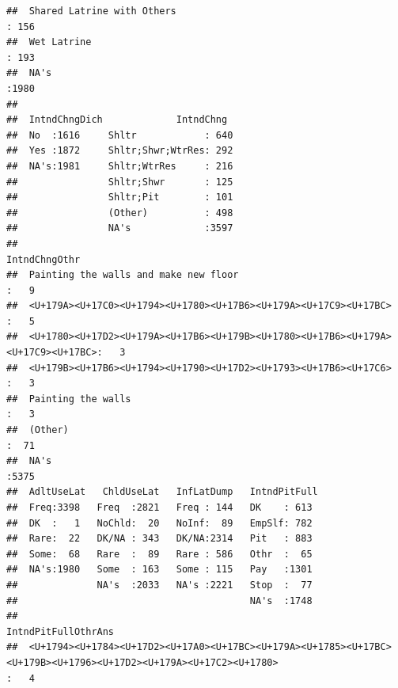 \documentclass[11pt,]{article}
\begin{document}
\begin{verbatim}
##  Shared Latrine with Others                                                                                                                                                                      : 156  
##  Wet Latrine                                                                                                                                                                                     : 193  
##  NA's                                                                                                                                                                                            :1980  
##                                                                                                                                                                                                         
##  IntndChngDich             IntndChng   
##  No  :1616     Shltr            : 640  
##  Yes :1872     Shltr;Shwr;WtrRes: 292  
##  NA's:1981     Shltr;WtrRes     : 216  
##                Shltr;Shwr       : 125  
##                Shltr;Pit        : 101  
##                (Other)          : 498  
##                NA's             :3597  
##                                                                           IntndChngOthr 
##  Painting the walls and make new floor                                           :   9  
##  <U+179A><U+17C0><U+1794><U+1780><U+17B6><U+179A><U+17C9><U+17BC>                :   5  
##  <U+1780><U+17D2><U+179A><U+17B6><U+179B><U+1780><U+17B6><U+179A><U+17C9><U+17BC>:   3  
##  <U+179B><U+17B6><U+1794><U+1790><U+17D2><U+1793><U+17B6><U+17C6>                :   3  
##  Painting the walls                                                              :   3  
##  (Other)                                                                         :  71  
##  NA's                                                                            :5375  
##  AdltUseLat   ChldUseLat   InfLatDump   IntndPitFull 
##  Freq:3398   Freq  :2821   Freq : 144   DK    : 613  
##  DK  :   1   NoChld:  20   NoInf:  89   EmpSlf: 782  
##  Rare:  22   DK/NA : 343   DK/NA:2314   Pit   : 883  
##  Some:  68   Rare  :  89   Rare : 586   Othr  :  65  
##  NA's:1980   Some  : 163   Some : 115   Pay   :1301  
##              NA's  :2033   NA's :2221   Stop  :  77  
##                                         NA's  :1748  
##                                                                                                                                                                        IntndPitFullOthrAns
##  <U+1794><U+1784><U+17D2><U+17A0><U+17BC><U+179A><U+1785><U+17BC><U+179B><U+1796><U+17D2><U+179A><U+17C2><U+1780>                                                                :   4    

\end{verbatim}
\end{document}
